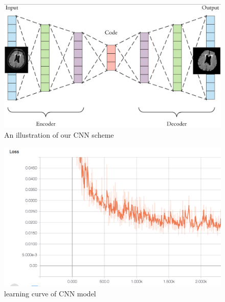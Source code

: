 \documentclass[conference]{IEEEtran}
\begin{document}
\begin{figure}[h!]
\centering 
\caption{An illustration of our CNN scheme}
\includegraphics[scale = 0.3]{Snipaste_2018-05-28_14-16-23.png}
\end{figure}

\begin{figure}[h!]
\centering 
\caption{learning curve of CNN model}
    \includegraphics[scale=0.2]{loss.png}  
\end{figure}
\end{document}
